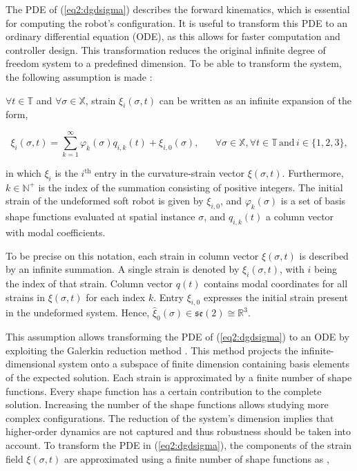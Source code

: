 The PDE of (\ref{eq2:dgdsigma}) describes the forward kinematics, which is essential for computing the robot's configuration. It is useful to transform this PDE to an ordinary differential equation (ODE), as this allows for faster computation and controller design. This transformation reduces the original infinite degree of freedom system to a predefined dimension. To be able to transform the system, the following assumption is made \cite{Caasenbrood2020}: 

\begin{theorem}

$\forall t \in \mathbb{T}$ and $\forall \sigma \in \mathbb{X}$, strain $\xi_i(\sigma,t)$ can be written as an infinite expansion of the form,

\begin{equation}
\xi_i(\sigma,t) = \sum_{k=1}^\infty \varphi_k(\sigma)q_{i,k}(t) + \xi_{i,0}(\sigma), \hspace{20pt} \forall \sigma \in \mathbb{X}, \forall t \in \mathbb{T} \hspace{2pt} \text{and} \hspace{2pt} i \in \{1,2,3\},
\label{eq2:strainexact}
\end{equation}

in which $\xi_{i}$ is the $i^{\text{th}}$ entry in the curvature-strain vector $\xi(\sigma,t)$. Furthermore, $k \in \mathbb{N}^+$ is the index of the summation consisting of positive integers. The initial strain of the undeformed soft robot is given by $\xi_{i,0}$, and $\varphi_k(\sigma)$ is a set of basis shape functions evaluated at spatial instance $\sigma$, and $q_{i,k}(t)$ a column vector with modal coefficients. 
\end{theorem}

To be precise on this notation, each strain in column vector $\xi(\sigma,t)$ is described by an infinite summation. A single strain is denoted by $\xi_i(\sigma,t)$, with $i$ being the index of that strain. Column vector $q(t)$ contains modal coordinates for all strains in $\xi(\sigma,t)$ for each index $k$. Entry $\xi_{i,0}$ expresses the initial strain present in the undeformed system. Hence, $\hat{\xi}_0(\sigma) \in \mathfrak{se}(2) \cong \mathbb{R}^3$. 

This assumption allows transforming the PDE of (\ref{eq2:dgdsigma}) to an ODE by exploiting the Galerkin reduction method \cite{Galerkin}. This method projects the infinite-dimensional system onto a subspace of finite dimension containing basis elements of the expected solution. Each strain is approximated by a finite number of shape functions. Every shape function has a certain contribution to the complete solution. Increasing the number of the shape functions allows studying more complex configurations. The reduction of the system's dimension implies that higher-order dynamics are not captured and thus robustness should be taken into account. To transform the PDE in (\ref{eq2:dgdsigma}), the components of the strain field $\xi(\sigma,t)$ are approximated using a finite number of shape functions as \cite{Caasenbrood2020},

